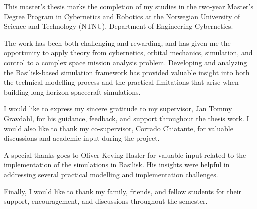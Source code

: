 This master's thesis marks the completion of my studies in the two-year Master's Degree Program in Cybernetics and Robotics at the Norwegian University of Science and Technology (NTNU), Department of Engineering Cybernetics.

The work has been both challenging and rewarding, and has given me the opportunity to apply theory from cybernetics, orbital mechanics, simulation, and control to a complex space mission analysis problem. Developing and analyzing the Basilisk-based simulation framework has provided valuable insight into both the technical modelling process and the practical limitations that arise when building long-horizon spacecraft simulations.

I would like to express my sincere gratitude to my supervisor, Jan Tommy Gravdahl, for his guidance, feedback, and support throughout the thesis work. I would also like to thank my co-supervisor, Corrado Chiatante, for valuable discussions and academic input during the project.

A special thanks goes to Oliver Keving Hasler for valuable input related to the implementation of the simulations in Basilisk. His insights were helpful in addressing several practical modelling and implementation challenges.

Finally, I would like to thank my family, friends, and fellow students for their support, encouragement, and discussions throughout the semester.